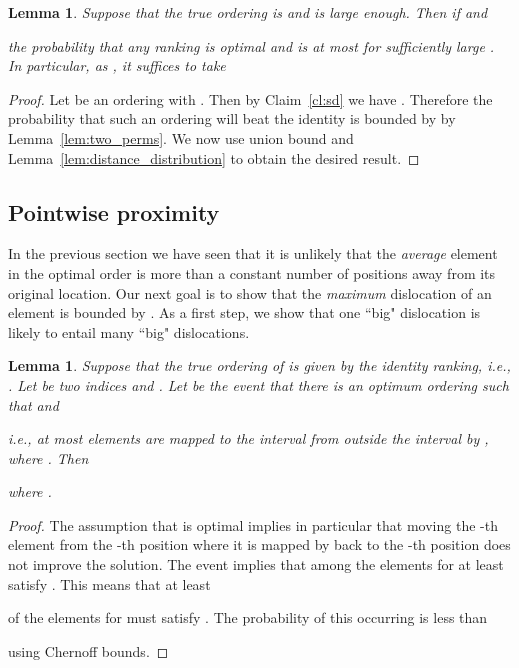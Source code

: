\documentclass[11pt]{article}
\newtheorem{lemma}[theorem]{Lemma}
\begin{document}
\begin{lemma}\label{lem:p0}
Suppose that the true ordering is  and  is large enough. 
Then if  and 

the probability that any ranking  is optimal and 
 is at most  for sufficiently large .
In particular, as , it suffices to take 

\end{lemma}

\begin{proof}
Let  be an ordering with . Then by Claim~\ref{cl:sd} 
we have . Therefore the probability that such 
an ordering will beat the identity is bounded by 
 by Lemma~\ref{lem:two_perms}. 
We now use union bound and Lemma~\ref{lem:distance_distribution} to obtain 
the desired result. 
\end{proof}





\subsection{Pointwise proximity} \label{subsec:log_dev}

In the previous section we have seen that it is unlikely that the {\em average} element 
in the optimal order is more than a constant number of positions away from its original
location. Our next goal is to show that the {\em maximum} dislocation of an element 
is bounded by . As a first step, we show that one ``big" dislocation
is likely to entail many ``big" dislocations.

\begin{lemma}
\label{lem:p1}
Suppose that the true ordering of  is given by the identity ranking, i.e., . Let  
be two indices and . 
Let  be the event that there is an optimum ordering  such 
that  and 

i.e., at most  elements are mapped to the interval  from 
outside the interval  by , where . Then

where .
\end{lemma}

\begin{proof}
The assumption that  is optimal implies in particular that moving the
-th element from the -th position where it is mapped by  back to the 
-th position does not improve the solution. The event  implies that 
among the elements  for  at least  
satisfy . This means that at least 

of the elements  for  must satisfy . 
The probability of this occurring is less than

using Chernoff bounds.
\end{proof}
\end{document}
